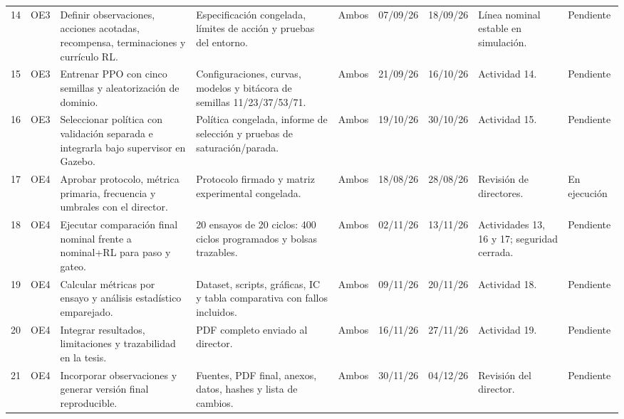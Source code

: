 \documentclass[10pt,letterpaper]{article}
\newcommand{\ejecucion}{\cellcolor{amarillo}En ejecución}
\newcommand{\pendiente}{\cellcolor{gris}Pendiente}
\begin{document}
\begin{landscape}
\begin{longtable}{p{0.55cm}p{0.65cm}p{4.2cm}p{4.0cm}p{1.3cm}p{1.35cm}p{1.35cm}p{3.7cm}p{1.5cm}}
14 & OE3 & Definir observaciones, acciones acotadas, recompensa, terminaciones y currículo RL. & Especificación congelada, límites de acción y pruebas del entorno. & Ambos & 07/09/26 & 18/09/26 & Línea nominal estable en simulación. & \pendiente\\
15 & OE3 & Entrenar PPO con cinco semillas y aleatorización de dominio. & Configuraciones, curvas, modelos y bitácora de semillas 11/23/37/53/71. & Ambos & 21/09/26 & 16/10/26 & Actividad 14. & \pendiente\\
16 & OE3 & Seleccionar política con validación separada e integrarla bajo supervisor en Gazebo. & Política congelada, informe de selección y pruebas de saturación/parada. & Ambos & 19/10/26 & 30/10/26 & Actividad 15. & \pendiente\\
17 & OE4 & Aprobar protocolo, métrica primaria, frecuencia y umbrales con el director. & Protocolo firmado y matriz experimental congelada. & Ambos & 18/08/26 & 28/08/26 & Revisión de directores. & \ejecucion\\
18 & OE4 & Ejecutar comparación final nominal frente a nominal+RL para paso y gateo. & 20 ensayos de 20 ciclos: 400 ciclos programados y bolsas trazables. & Ambos & 02/11/26 & 13/11/26 & Actividades 13, 16 y 17; seguridad cerrada. & \pendiente\\
19 & OE4 & Calcular métricas por ensayo y análisis estadístico emparejado. & Dataset, scripts, gráficas, IC y tabla comparativa con fallos incluidos. & Ambos & 09/11/26 & 20/11/26 & Actividad 18. & \pendiente\\
20 & OE4 & Integrar resultados, limitaciones y trazabilidad en la tesis. & PDF completo enviado al director. & Ambos & 16/11/26 & 27/11/26 & Actividad 19. & \pendiente\\
21 & OE4 & Incorporar observaciones y generar versión final reproducible. & Fuentes, PDF final, anexos, datos, hashes y lista de cambios. & Ambos & 30/11/26 & 04/12/26 & Revisión del director. & \pendiente\\
\end{longtable}
\end{landscape}
\end{document}
